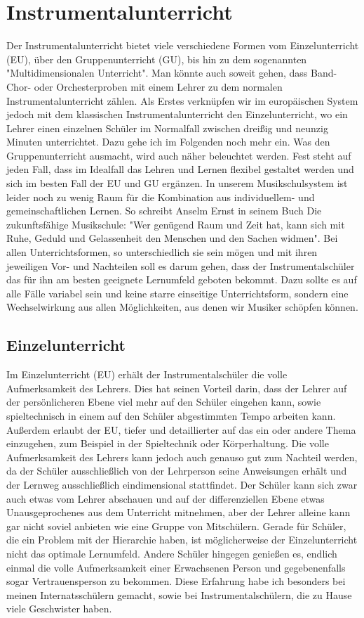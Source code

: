 \section{Instrumentalunterricht}
Der Instrumentalunterricht bietet viele verschiedene Formen vom Einzelunterricht
(EU), über den Gruppenunterricht (GU), bis hin zu dem sogenannten
"Multidimensionalen Unterricht". Man könnte auch soweit gehen, dass Band- Chor-
oder Orchesterproben mit einem Lehrer zu dem normalen Instrumentalunterricht
zählen. Als Erstes verknüpfen wir im europäischen System jedoch mit dem
klassischen Instrumentalunterricht den Einzelunterricht, wo ein Lehrer einen
einzelnen Schüler im Normalfall zwischen dreißig und neunzig Minuten
unterrichtet. Dazu gehe ich im Folgenden noch mehr ein. Was den
Gruppenunterricht ausmacht, wird auch näher beleuchtet werden. Fest steht auf
jeden Fall, dass im Idealfall das Lehren und Lernen flexibel gestaltet werden
und sich im besten Fall der EU und GU ergänzen. In unserem Musikschulsystem ist
leider noch zu wenig Raum für die Kombination aus individuellem- und
gemeinschaftlichen Lernen. So schreibt Anselm Ernst in seinem Buch Die
zukunftsfähige Musikschule: "Wer genügend Raum und Zeit hat, kann sich mit Ruhe,
Geduld und Gelassenheit den Menschen und den Sachen widmen".
\autocite[84]{ernst:die_zukunftsfaehige_musikschule} Bei allen
Unterrichtsformen, so unterschiedlich sie sein mögen und mit ihren jeweiligen
Vor- und Nachteilen soll es darum gehen, dass der Instrumentalschüler das für
ihn am besten geeignete Lernumfeld geboten bekommt. Dazu sollte es auf alle
Fälle variabel sein und keine starre einseitige Unterrichtsform, sondern eine
Wechselwirkung aus allen Möglichkeiten, aus denen wir Musiker schöpfen können. 


\subsection{Einzelunterricht}
Im Einzelunterricht (EU) erhält der Instrumentalschüler die volle Aufmerksamkeit
des Lehrers. Dies hat seinen Vorteil darin, dass der Lehrer auf der
persönlicheren Ebene viel mehr auf den Schüler eingehen kann, sowie
spieltechnisch in einem auf den Schüler abgestimmten Tempo arbeiten kann.
Außerdem erlaubt der EU, tiefer und detaillierter auf das ein oder andere Thema
einzugehen, zum Beispiel in der Spieltechnik oder Körperhaltung. Die volle
Aufmerksamkeit des Lehrers kann jedoch auch genauso gut zum Nachteil werden, da
der Schüler ausschließlich von der Lehrperson seine Anweisungen erhält und der
Lernweg ausschließlich eindimensional stattfindet. Der Schüler kann sich zwar
auch etwas vom Lehrer abschauen und auf der differenziellen Ebene etwas
Unausgeprochenes aus dem Unterricht mitnehmen, aber der Lehrer alleine kann gar
nicht soviel anbieten wie eine Gruppe von Mitschülern. Gerade für Schüler, die
ein Problem mit der Hierarchie haben, ist möglicherweise der Einzelunterricht
nicht das optimale Lernumfeld. Andere Schüler hingegen genießen es, endlich
einmal die volle Aufmerksamkeit einer Erwachsenen Person und gegebenenfalls
sogar Vertrauensperson zu bekommen. Diese Erfahrung habe ich besonders bei
meinen Internatsschülern gemacht, sowie bei Instrumentalschülern, die zu Hause
viele Geschwister haben. 

